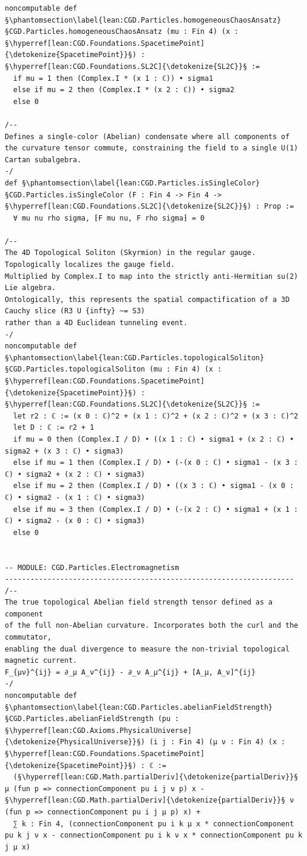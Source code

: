 \begin{verbatim}
noncomputable def §\phantomsection\label{lean:CGD.Particles.homogeneousChaosAnsatz}§CGD.Particles.homogeneousChaosAnsatz (mu : Fin 4) (x : §\hyperref[lean:CGD.Foundations.SpacetimePoint]{\detokenize{SpacetimePoint}}§) : §\hyperref[lean:CGD.Foundations.SL2C]{\detokenize{SL2C}}§ :=
  if mu = 1 then (Complex.I * (x 1 : ℂ)) • sigma1
  else if mu = 2 then (Complex.I * (x 2 : ℂ)) • sigma2
  else 0

/--
Defines a single-color (Abelian) condensate where all components of the curvature tensor commute, constraining the field to a single U(1) Cartan subalgebra.
-/
def §\phantomsection\label{lean:CGD.Particles.isSingleColor}§CGD.Particles.isSingleColor (F : Fin 4 -> Fin 4 -> §\hyperref[lean:CGD.Foundations.SL2C]{\detokenize{SL2C}}§) : Prop :=
  ∀ mu nu rho sigma, ⁅F mu nu, F rho sigma⁆ = 0

/--
The 4D Topological Soliton (Skyrmion) in the regular gauge.
Topologically localizes the gauge field.
Multiplied by Complex.I to map into the strictly anti-Hermitian su(2) Lie algebra.
Ontologically, this represents the spatial compactification of a 3D Cauchy slice (R3 U {infty} ~= S3)
rather than a 4D Euclidean tunneling event.
-/
noncomputable def §\phantomsection\label{lean:CGD.Particles.topologicalSoliton}§CGD.Particles.topologicalSoliton (mu : Fin 4) (x : §\hyperref[lean:CGD.Foundations.SpacetimePoint]{\detokenize{SpacetimePoint}}§) : §\hyperref[lean:CGD.Foundations.SL2C]{\detokenize{SL2C}}§ :=
  let r2 : ℂ := (x 0 : ℂ)^2 + (x 1 : ℂ)^2 + (x 2 : ℂ)^2 + (x 3 : ℂ)^2
  let D : ℂ := r2 + 1
  if mu = 0 then (Complex.I / D) • ((x 1 : ℂ) • sigma1 + (x 2 : ℂ) • sigma2 + (x 3 : ℂ) • sigma3)
  else if mu = 1 then (Complex.I / D) • (-(x 0 : ℂ) • sigma1 - (x 3 : ℂ) • sigma2 + (x 2 : ℂ) • sigma3)
  else if mu = 2 then (Complex.I / D) • ((x 3 : ℂ) • sigma1 - (x 0 : ℂ) • sigma2 - (x 1 : ℂ) • sigma3)
  else if mu = 3 then (Complex.I / D) • (-(x 2 : ℂ) • sigma1 + (x 1 : ℂ) • sigma2 - (x 0 : ℂ) • sigma3)
  else 0


-- MODULE: CGD.Particles.Electromagnetism
--------------------------------------------------------------------
/--
The true topological Abelian field strength tensor defined as a component
of the full non-Abelian curvature. Incorporates both the curl and the commutator,
enabling the dual divergence to measure the non-trivial topological magnetic current.
F_{μν}^{ij} = ∂_μ A_ν^{ij} - ∂_ν A_μ^{ij} + [A_μ, A_ν]^{ij}
-/
noncomputable def §\phantomsection\label{lean:CGD.Particles.abelianFieldStrength}§CGD.Particles.abelianFieldStrength (pu : §\hyperref[lean:CGD.Axioms.PhysicalUniverse]{\detokenize{PhysicalUniverse}}§) (i j : Fin 4) (μ ν : Fin 4) (x : §\hyperref[lean:CGD.Foundations.SpacetimePoint]{\detokenize{SpacetimePoint}}§) : ℂ :=
  (§\hyperref[lean:CGD.Math.partialDeriv]{\detokenize{partialDeriv}}§ μ (fun p => connectionComponent pu i j ν p) x - §\hyperref[lean:CGD.Math.partialDeriv]{\detokenize{partialDeriv}}§ ν (fun p => connectionComponent pu i j μ p) x) +
  ∑ k : Fin 4, (connectionComponent pu i k μ x * connectionComponent pu k j ν x - connectionComponent pu i k ν x * connectionComponent pu k j μ x)


\end{verbatim}
